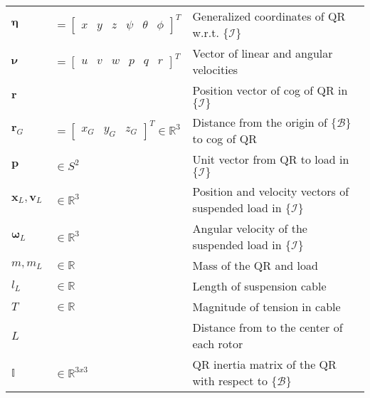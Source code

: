 \begin{tabularx}{\linewidth}{lll}
		$ \boldsymbol{\eta} $ &$= \begin{bmatrix}\!x&\!\!y&\!\!z&\!\!\psi&\!\!\theta&\!\!\phi\end{bmatrix}^T $&  Generalized coordinates of QR w.r.t. $ \{\mathcal{I}\} $ \\
		$ \boldsymbol{\nu} $&$= \begin{bmatrix}\!u&\!\!v&\!\!w&\!\!p&\!\!q&\!\!r\end{bmatrix}^T $ & Vector of linear and angular velocities\\
		$ \mathbf{r}$&&Position vector of \acs{cog} of QR in $ \{\mathcal{I}\} $\\
		$ \mathbf{r}_{G}$&$=\begin{bmatrix}\!x_G&\!\!y_G&\!\!z_G\end{bmatrix}^T  \in\mathbb{R}^3  $ & Distance from the origin of $ \{\mathcal{B}\} $ to \acs{cog} of QR\\
		$ \mathbf{p}$ & $ \in S^2 $ & Unit vector from QR to load in $ \{\mathcal{I}\} $\\
		$ \mathbf{x}_L, \mathbf{v}_L $ & $ \in \mathbb{R}^3 $ & Position and velocity vectors of suspended load in $ \{\mathcal{I}\} $\\
		$ \boldsymbol{\omega}_L $ & $ \in \mathbb{R}^3 $ & Angular velocity of the suspended load in $ \{\mathcal{I}\} $\\
		$ m, m_L $&$ \in \mathbb{R}$ & Mass of the QR and load \\
		$ l_L $&$ \in\mathbb{R} $&Length of suspension cable\\
		$ T $&$ \in\mathbb{R} $&Magnitude of tension in cable\\
		
		$ L $ && Distance from \a{cog} to the center of each rotor\\
		$\mathbb{I}$&$\in\mathbb{R}^{3x3}  $    & QR inertia matrix of the QR with respect to $ \{\mathcal{B}\}   $              \\



\end{tabularx}
